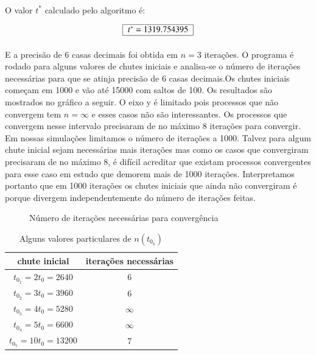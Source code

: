 \documentclass[a4paper,11pt]{article}
\begin{document}
\paragraph{} O valor $t^*$ calculado pelo algoritmo é:

\begin{equation}
	\centering
	\begin{tabular}{|c|}\hline 
		$t^* = 1319.754395$ \\ \hline
	\end{tabular}
\end{equation}
\paragraph{} E a precisão de 6 casas decimais foi obtida em $n = 3$ iterações. O programa é rodado para alguns valores de chutes iniciais e analisa-se o número de iterações necessárias para que se atinja precisão de 6 casas decimais.Os chutes iniciais começam em 1000 e vão até 15000 com saltos de 100. Os resultados são mostrados no gráfico a seguir. O eixo y é limitado pois processos que não convergem tem $n =\infty$ e esses casos não são interessantes. Os processos que convergem nesse intervalo precisaram de no máximo 8 iterações para convergir. Em nossas simulações limitamos o número de iterações a 1000. Talvez para algum chute inicial sejam necessárias mais iterações mas como os casos que convergiram precisaram de no máximo 8, é difícil acreditar que existam processos convergentes para esse caso em estudo que demorem mais de 1000 iterações. Interpretamos portanto que em 1000 iterações os chutes iniciais que ainda não convergiram é porque divergem independentemente do número de iterações feitas.
\FloatBarrier
\begin{figure}[!htp]
\centering
	
	\caption{Número de iterações necessárias para convergência}
	\label{graph:6-2}
\end{figure}  
\FloatBarrier
	\begin{table}[!htp]
		\centering
		\begin{tabular}{|c|c|} \hline
			chute inicial & iterações necessárias \\ \hline
			$t_{0_1} = 2 t_0 = 2640$ & 6 \\ \hline
			$t_{0_2} = 3 t_0 = 3960$ & 6 \\ \hline
			$t_{0_3} = 4 t_0 = 5280$ & $\infty$ \\ \hline
			$t_{0_4} = 5 t_0 = 6600$ & $\infty$  \\ \hline
			$t_{0_5} = 10 t_0 = 13200$ & 7 \\ \hline		
		\end{tabular}
		\caption{Alguns valores particulares de $n(t_{0_k})$}
		\label{table:t-n}		
	\end{table}
\end{document}
